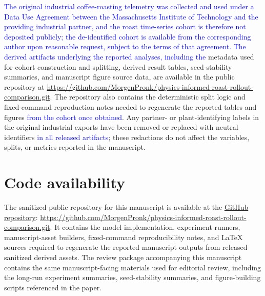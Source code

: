 \documentclass[fleqn,10pt]{wlscirep}
\newcommand{\rev}[1]{\textcolor{blue}{#1}}
\begin{document}
\rev{The original industrial coffee-roasting telemetry was collected and used under a Data Use Agreement between the Massachusetts Institute of Technology and the providing industrial partner, and the roast time-series cohort is therefore not deposited publicly; the de-identified cohort is available from the corresponding author upon reasonable request, subject to the terms of that agreement. The derived artifacts underlying the reported analyses, including the} metadata used for cohort construction and splitting, derived result tables, seed-stability summaries, and manuscript figure source data, are available in the public repository at \url{https://github.com/MorgenPronk/physics-informed-roast-rollout-comparison.git}. The repository also contains the deterministic split logic and fixed-command reproduction notes needed to regenerate the reported tables and figures\rev{ from the cohort once obtained}. Any partner- or plant-identifying labels in the original industrial exports have been removed or replaced with neutral identifiers \rev{in all released artifacts}; these redactions do not affect the variables, splits, or metrics reported in the manuscript.

\section*{Code availability}

The sanitized public repository for this manuscript is available at the \href{https://github.com/MorgenPronk/physics-informed-roast-rollout-comparison.git}{GitHub repository}: \url{https://github.com/MorgenPronk/physics-informed-roast-rollout-comparison.git}. It contains the model implementation, experiment runners, manuscript-asset builders, fixed-command reproducibility notes, and LaTeX sources required to regenerate the reported manuscript outputs from released sanitized derived assets. The review package accompanying this manuscript contains the same manuscript-facing materials used for editorial review, including the long-run experiment summaries, seed-stability summaries, and figure-building scripts referenced in the paper.
\end{document}
